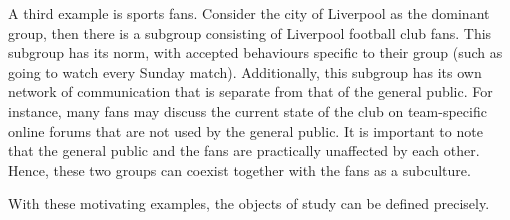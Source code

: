 \documentclass[12pt]{article}
\begin{document}
A third example is sports fans. Consider the city of Liverpool as the dominant group,
then there is a subgroup consisting of Liverpool football club fans. This subgroup
has its norm, with accepted behaviours specific to their group (such as going to watch every Sunday match).
Additionally, this subgroup has its own network of communication that is separate from that of the general public.
For instance, many fans may discuss the current state of the club on team-specific online forums that
are not used by the general public. It is important to note that the general public and the fans
are practically unaffected by each other. Hence, these two groups can coexist together with
the fans as a subculture.

With these motivating examples, the objects of study can be defined precisely.
\end{document}

